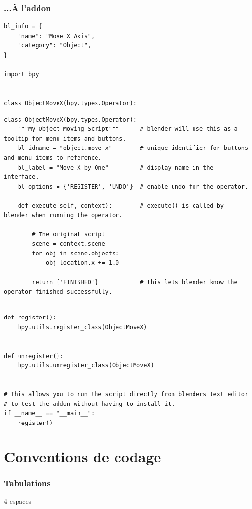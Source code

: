 \documentclass[11pt,usenames,dvipsnames]{beamer}
\begin{document}
\begin{frame}[fragile]
  \frametitle{...À l'addon}
  \begin{lstlisting}
bl_info = {
    "name": "Move X Axis",
    "category": "Object",
}

import bpy


class ObjectMoveX(bpy.types.Operator):
  \end{lstlisting}
\end{frame}

\begin{frame}[fragile]
  \begin{lstlisting}
class ObjectMoveX(bpy.types.Operator):
    """My Object Moving Script"""      # blender will use this as a tooltip for menu items and buttons.
    bl_idname = "object.move_x"        # unique identifier for buttons and menu items to reference.
    bl_label = "Move X by One"         # display name in the interface.
    bl_options = {'REGISTER', 'UNDO'}  # enable undo for the operator.

    def execute(self, context):        # execute() is called by blender when running the operator.

        # The original script
        scene = context.scene
        for obj in scene.objects:
            obj.location.x += 1.0

        return {'FINISHED'}            # this lets blender know the operator finished successfully.
  \end{lstlisting}
\end{frame}

\begin{frame}[fragile]
  \begin{lstlisting}

def register():
    bpy.utils.register_class(ObjectMoveX)


def unregister():
    bpy.utils.unregister_class(ObjectMoveX)


# This allows you to run the script directly from blenders text editor
# to test the addon without having to install it.
if __name__ == "__main__":
    register()
  \end{lstlisting}
\end{frame}

\section{Conventions de codage}
\begin{frame}
  \frametitle{Tabulations}
  {\Huge 4 espaces}
\end{frame}
\end{document}
